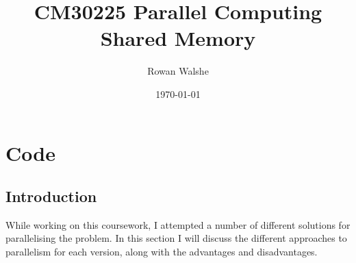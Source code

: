 \documentclass{report}
\title{CM30225 Parallel Computing\\Shared Memory} %
\author{Rowan Walshe} %
\date{\today} %
\begin{document}
\maketitle %

\pagebreak

\chapter{Code}
\section{Introduction}
While working on this coursework, I attempted a number of different solutions for parallelising the problem. In this section I will discuss the different approaches to parallelism for each version, along with the advantages and disadvantages.
\end{document}
